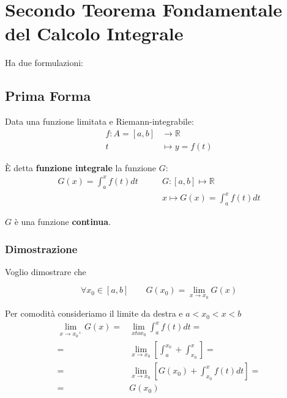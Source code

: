 \documentclass[../dimostrazioni]{subfiles}
\begin{document}
    \chapter{Secondo Teorema Fondamentale del Calcolo Integrale}
    \label{teoFondCalcoloIntegrale2}

    Ha due formulazioni:

    \section*{Prima Forma}

        Data una funzione limitata e Riemann-integrabile:
        \begin{align*}
            f : A = [a, b] &\longrightarrow \mathbb{R}\\
            t &\longmapsto y = f(t) 
        \end{align*}

        È detta \textbf{funzione integrale} la funzione \(G\):
        \begin{align*}
            G(x) = \int_{a}^{x} f(t) dt \qquad   &{G : [a, b] \longmapsto \mathbb{R}} \\
            &{x \longmapsto G(x) = \int_{a}^{x} f(t) dt}
        \end{align*}

        \(G\) è una funzione \textbf{continua}.
            
            \subsection*{Dimostrazione}

                Voglio dimostrare che 

                \[\forall x_0 \in [a, b] \qquad G(x_0) = \lim_{x \to  x_0} G(x) \]
                
                Per comodità consideriamo il limite da destra e \(a < x_0 < x < b \)
                \begin{align*}
                    \lim_{x \to {x_0}^{+}}G(x) =& \lim_{x to x_0}{\int_{a}^{x}f(t) dt} = \\
                    =& \lim_{x \to x_0} \left[ \int_{a}^{x_0} + \int_{x_0}^{x} \right] = \\
                    =& \lim_{x \to x_0} \left[ G(x_0) + \int_{x_0}^{x} f(t) dt \right] = \\
                    =& G(x_0)
                \end{align*}
\end{document}
